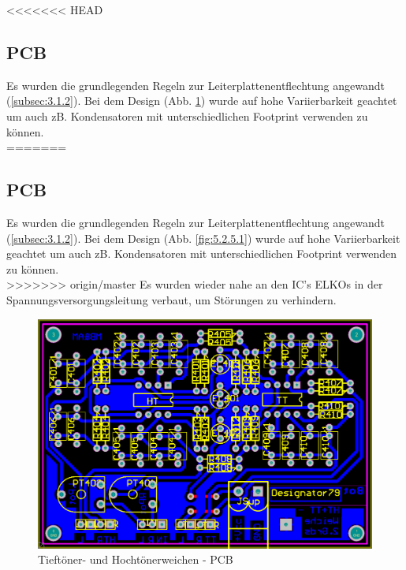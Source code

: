 <<<<<<< HEAD
\subsection{PCB}\label{subsec:4.2.5}
Es wurden die grundlegenden Regeln zur Leiterplattenentflechtung angewandt (\ref{subsec:3.1.2}). Bei dem Design (Abb. \ref{fig:4.2.5.1}) wurde auf hohe Variierbarkeit geachtet um auch zB. Kondensatoren mit unterschiedlichen Footprint verwenden zu können.\\
=======
\subsection{PCB}\label{subsec:5.2.5}
Es wurden die grundlegenden Regeln zur Leiterplattenentflechtung angewandt (\ref{subsec:3.1.2}). Bei dem Design (Abb. \ref{fig:5.2.5.1}) wurde auf hohe Variierbarkeit geachtet um auch zB. Kondensatoren mit unterschiedlichen Footprint verwenden zu können.\\
>>>>>>> origin/master
Es wurden wieder nahe an den IC's ELKOs in der Spannungsversorgungsleitung verbaut, um Störungen zu verhindern.

\begin{figure} [H]
	\centering	
	\includegraphics[width=1\textwidth]{img/Print4/4_TTuHTWeiche-PCB.PNG}
	\caption{Tieftöner- und Hochtönerweichen - PCB}
	\label {fig:4.2.5.1}
\end{figure}



